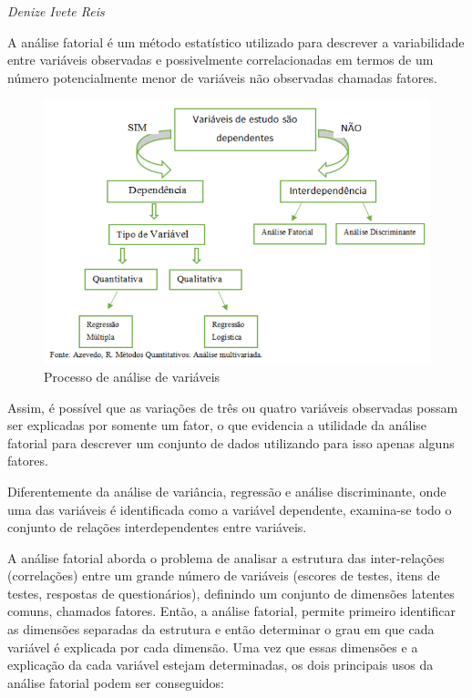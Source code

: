 \documentclass[12pt,brazil,oneside]{book}
\begin{document}
\emph{Denize Ivete Reis}

\begin{flushright}
\emph{}
\end{flushright}

A análise fatorial é um método estatístico utilizado para descrever a variabilidade entre variáveis observadas e possivelmente correlacionadas em termos de um número potencialmente menor de variáveis não observadas chamadas fatores.

\begin{figure}[H]

{\centering \includegraphics[width=0.8\linewidth]{anfat1} 

}

\caption{Processo de análise de variáveis}\label{fig:unnamed-chunk-19}
\end{figure}

Assim, é possível que as variações de três ou quatro variáveis observadas possam ser explicadas por somente um fator, o que evidencia a utilidade da análise fatorial para descrever um conjunto de dados utilizando para isso apenas alguns fatores.

Diferentemente da análise de variância, regressão e análise discriminante, onde uma das variáveis é identificada como a variável dependente, examina-se todo o conjunto de relações interdependentes entre variáveis.

A análise fatorial aborda o problema de analisar a estrutura das inter-relações (correlações) entre um grande número de variáveis (escores de testes, itens de testes, respostas de questionários), definindo um conjunto de dimensões latentes comuns, chamados fatores. Então, a análise fatorial, permite primeiro identificar as dimensões separadas da estrutura e então determinar o grau em que cada variável é explicada por cada dimensão. Uma vez que essas dimensões e a explicação da cada variável estejam determinadas, os dois principais usos da análise fatorial podem ser conseguidos:
\end{document}
